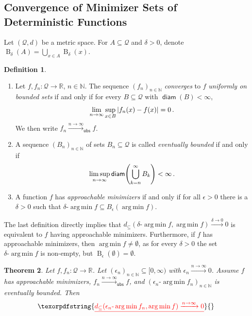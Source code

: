 \documentclass{scrartcl}
\renewcommand{\subset}{\subseteq}
\DeclareMathOperator{\diam}{\mathsf{diam}}
\DeclareMathOperator{\ball}{\mathrm{B}}
\newcommand*{\mc}[1]{\mathcal{#1}}
\newcommand{\N}{\mathbb{N}}
\newcommand{\R}{\mathbb{R}}
\newcommand{\equationFullstop}{\, .}
\newcommand{\eqfs}{\equationFullstop}
\DeclareMathOperator*{\argmin}{arg\,min}
\def\MS{\mathcal{Q}}\def\epi{\mathsf{epi}}\def\aec{\mathsf{aec}}\def\alsec{\mathsf{alsec}}\def\aecp{\mathsf{aec}_P}\def\Hausdorff{\mathsf{H}}\def\Haus{\mathsf{H}}\def\ubs{\mathsf{ubs}}\newcommand{\epiconv}[1]{\xrightarrow{#1\to\infty}_\epi}\newcommand{\hausconv}[1]{\xrightarrow{#1\to\infty}_\Hausdorff}\newcommand{\ubsconv}[1]{\xrightarrow{#1\to\infty}_\ubs}\newcommand{\ol}[2]{\overline{#1,\!#2}}
\theoremstyle{plain}\newtheorem{theorem}{Theorem}[section]
\theoremstyle{definition}
\newtheorem{definition}[theorem]{Definition}
\theoremstyle{remark}
\providecommand{\DIFdeltex}[1]{{\protect\color{red}\sout{#1}}}                      %
\providecommand{\DIFdelbegin}{} %
\providecommand{\DIFdel}[1]{\texorpdfstring{\DIFdeltex{#1}}{}} %
\newcommand{\DIFscaledelfig}{0.5}
\newlength{\DIFdelgraphicswidth} %
\newlength{\DIFdelgraphicsheight} %
\newcommand{\DIFdelincludegraphics}[2][]{%
\sbox{\DIFdelgraphicsbox}{\DIFOincludegraphics[#1]{#2}}%
\settoboxwidth{\DIFdelgraphicswidth}{\DIFdelgraphicsbox} %
\settoboxtotalheight{\DIFdelgraphicsheight}{\DIFdelgraphicsbox} %
\scalebox{\DIFscaledelfig}{%
\parbox[b]{\DIFdelgraphicswidth}{\usebox{\DIFdelgraphicsbox}\\[-\baselineskip] \rule{\DIFdelgraphicswidth}{0em}}\llap{\resizebox{\DIFdelgraphicswidth}{\DIFdelgraphicsheight}{%
\setlength{\unitlength}{\DIFdelgraphicswidth}%
\begin{picture}(1,1)%
\thicklines\linethickness{2pt} %
{\color[rgb]{1,0,0}\put(0,0){\framebox(1,1){}}}%
{\color[rgb]{1,0,0}\put(0,0){\line( 1,1){1}}}%
{\color[rgb]{1,0,0}\put(0,1){\line(1,-1){1}}}%
\end{picture}%
}\hspace*{3pt}}} %
} %
\DeclareRobustCommand{\DIFdelbegin}{\DIFOdelbegin \let\includegraphics\DIFdelincludegraphics} %
\begin{document}
\begin{appendix}
\subsection{Convergence of Minimizer Sets of Deterministic Functions}\label{ssec:alt:det}
Let $(\mc Q, d)$ be a metric space. For $A\subset \mc Q$ and $\delta>0$, denote $\ball_\delta(A) = \bigcup_{x\in A} \ball_\delta(x)$. 
\begin{definition} \mbox{ }
	\begin{enumerate}[label=(\roman*)]
	\item 
		Let $f,f_n \colon \MS\to\R$, $n\in\N$.
		The sequence $(f_n)_{n\in\N}$  \emph{converges} to $f$ \emph{uniformly on bounded sets} if and only if for every $B\subset \MS$ with $\diam(B)<\infty$,
		\begin{equation*}
		\lim_{n\to\infty} \sup_{x\in B}\abs{f_n(x) - f(x)} =0
		\eqfs
		\end{equation*}
		We then write $f_n\ubsconv{n}f$.
	\item 
		A sequence $(B_n)_{n\in\N}$ of sets $B_n \subset \MS$ is called \emph{eventually bounded} if and only if
		\begin{equation*}
		\limsup_{n\to\infty} \diam\brOf{\bigcup_{k=n}^\infty B_k} < \infty
		\eqfs
		\end{equation*}
	\item 
		A function $f$ has \emph{approachable minimizers} if and only if for all $\epsilon >0$ there is a $\delta>0$ such that
		$\delta\text{-}\argmin f \subset B_\epsilon(\argmin f)$.
	\end{enumerate}	
\end{definition}
The last definition directly implies that $d_\subset(\delta\text{-}\argmin f, \argmin f) \xrightarrow{\delta\to0} 0$ is equivalent to $f$ having approachable minimizers. Furthermore, if $f$ has approachable minimizers, then $\argmin f \neq \emptyset$, as for every $\delta>0$ the set $\delta\text{-}\argmin f$ is non-empty, but $\ball_\epsilon(\emptyset)=\emptyset$.
\begin{theorem}\label{thm:alt:convOfMini}
	Let $f,f_n \colon \MS\to\R$. Let $(\epsilon_n)_{n\in\N}\subset [0,\infty)$ with $\epsilon_n \xrightarrow{n\to\infty}0$. 
	Assume $f$ has approachable minimizers, $f_n \xrightarrow{n\to\infty}_{\ubs} f$, and $(\epsilon_n\text{-}\argmin f_n)_{n\in\N}$ is eventually bounded.
	Then
	\DIFdelbegin \begin{displaymath}
		\DIFdel{d_\subset(\epsilon_n\text{-}\argmin f_n, \argmin f)\xrightarrow{n\to\infty}
		0
	}\end{displaymath}%

\end{theorem}
\end{appendix}
\end{document}

